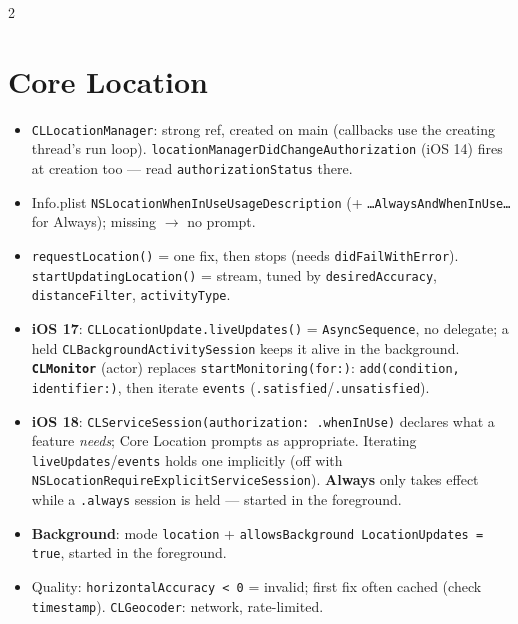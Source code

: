 \documentclass[8pt]{extarticle}
\begin{document}
\begin{multicols}{2}
\raggedright

\section{Core Location}
\begin{itemize}
  \item \texttt{CLLocationManager}: strong ref, created on main (callbacks use the
        creating thread's run loop). \texttt{locationManagerDidChangeAuthorization}
        (iOS 14) fires at creation too — read \texttt{authorizationStatus} there.
  \item Info.plist \texttt{NSLocationWhenInUseUsageDescription} (+
        \texttt{\dots AlwaysAndWhenInUse\dots} for Always); missing $\to$ no prompt.
  \item \texttt{requestLocation()} = one fix, then stops (needs
        \texttt{didFailWithError}). \texttt{startUpdatingLocation()} = stream, tuned
        by \texttt{desiredAccuracy}, \texttt{distanceFilter}, \texttt{activityType}.
  \item \textbf{iOS 17}: \texttt{CLLocationUpdate.liveUpdates()} =
        \texttt{AsyncSequence}, no delegate; a held
        \texttt{CLBackground\allowbreak ActivitySession} keeps it alive in the background. \textbf{\texttt{CLMonitor}} (actor) replaces
        \texttt{startMonitoring(for:)}: \texttt{add(condition, identifier:)}, then
        iterate \texttt{events} (\texttt{.satisfied}/\texttt{.unsatisfied}).
  \item \textbf{iOS 18}: \texttt{CLServiceSession(authorization: .whenInUse)} declares what
        a feature \emph{needs}; Core Location prompts as appropriate. Iterating
        \texttt{liveUpdates}/\texttt{events} holds one implicitly (off with
        \texttt{NSLocationRequireExplicitServiceSession}). \textbf{Always} only takes
        effect while a \texttt{.always} session is held — started in the foreground.
  \item \textbf{Background}: mode \texttt{location} + \texttt{allowsBackground\allowbreak
        LocationUpdates = true}, started in the foreground.
  \item Quality: \texttt{horizontalAccuracy < 0} = invalid; first fix often cached
        (check \texttt{timestamp}). \texttt{CLGeocoder}: network, rate-limited.
\end{itemize}


\end{multicols}
\end{document}
